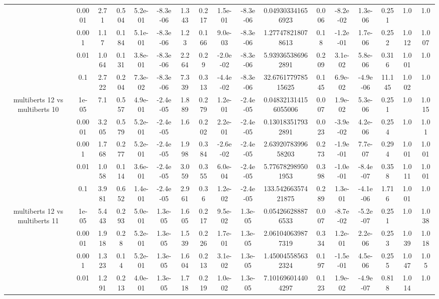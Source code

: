 \begin{tabular}{|c|c|c|c|c|c|c|c|c|c|c|c|c|c|c|c|c|}
 & 0.0001 & 2.71 & 0.504 & 5.2e-01 & -8.3e-06 & 1.343 & 0.217 & 1.5e-01 & -8.3e-06 & 0.049303341656923 & 0.006 & -8.2e-02 & 1.3e-06 & 0.251 & 1.0 & 1.0 \\
 & 0.001 & 1.17 & 0.184 & 5.1e-01 & -8.3e-06 & 1.23 & 0.166 & 9.0e-03 & -8.3e-06 & 1.277478218078613 & 0.18 & -1.2e-01 & 1.7e-06 & 0.252 & 1.012 & 1.007 \\
 & 0.01 & 1.064 & 0.131 & 3.8e-01 & -8.3e-06 & 2.264 & 0.29 & -2.0e-02 & -8.3e-06 & 5.939365386962891 & 0.209 & 3.1e-02 & 5.8e-06 & 0.316 & 1.001 & 1.0 \\
 & 0.1 & 2.722 & 0.204 & 7.3e-02 & -8.3e-06 & 7.339 & 0.313 & -4.4e-02 & -8.3e-06 & 32.676177978515625 & 0.145 & 6.9e-02 & -4.9e-06 & 11.145 & 1.002 & 1.0 \\
\hline
\multirow{5}{*}{multiberts 12 vs multiberts 10} & 1e-05 & 7.1 & 0.557 & 4.9e-01 & -2.4e-05 & 1.889 & 0.279 & 1.2e-01 & -2.4e-05 & 0.048321314156055006 & 0.007 & 1.9e-02 & 5.3e-06 & 0.251 & 1.0 & 1.015 \\
 & 0.0001 & 3.205 & 0.579 & 5.2e-01 & -2.4e-05 & 1.6 & 0.202 & 2.2e-01 & -2.4e-05 & 0.130183517932891 & 0.023 & -3.9e-02 & 4.2e-06 & 0.254 & 1.0 & 1.01 \\
 & 0.001 & 1.768 & 0.277 & 5.2e-01 & -2.4e-05 & 1.998 & 0.384 & -2.6e-02 & -2.4e-05 & 2.6392078399658203 & 0.273 & -1.9e-01 & 7.7e-07 & 0.294 & 1.001 & 1.001 \\
 & 0.01 & 1.058 & 0.114 & 3.6e-01 & -2.4e-05 & 3.059 & 0.355 & 6.0e-04 & -2.4e-05 & 5.776782989501953 & 0.398 & -1.0e-01 & -8.4e-07 & 0.358 & 1.011 & 1.001 \\
 & 0.1 & 3.981 & 0.652 & 1.4e-01 & -2.4e-05 & 2.961 & 0.36 & 1.2e-02 & -2.4e-05 & 133.54266357421875 & 0.289 & 1.3e-01 & -4.1e-06 & 1.716 & 1.001 & 1.0 \\
\hline
\multirow{5}{*}{multiberts 12 vs multiberts 11} & 1e-05 & 5.443 & 0.293 & 5.0e-01 & 1.3e-05 & 1.605 & 0.217 & 9.5e-02 & 1.3e-05 & 0.054266288876533 & 0.007 & -8.7e-02 & -5.2e-07 & 0.251 & 1.0 & 1.038 \\
 & 0.0001 & 1.918 & 0.28 & 5.2e-01 & 1.3e-05 & 1.539 & 0.226 & 1.7e-01 & 1.3e-05 & 2.061040639877319 & 0.334 & 1.2e-01 & 2.2e-06 & 0.253 & 1.039 & 1.018 \\
 & 0.001 & 1.323 & 0.14 & 5.2e-01 & 1.3e-05 & 1.604 & 0.213 & 3.1e-02 & 1.3e-05 & 1.450045585632324 & 0.197 & -1.5e-01 & 4.5e-06 & 0.255 & 1.047 & 1.05 \\
 & 0.01 & 1.291 & 0.213 & 4.0e-01 & 1.3e-05 & 1.718 & 0.219 & 1.0e-02 & 1.3e-05 & 7.101696014404297 & 0.123 & 1.9e-02 & -4.9e-07 & 0.818 & 1.014 & 1.0 \\

\end{tabular}
